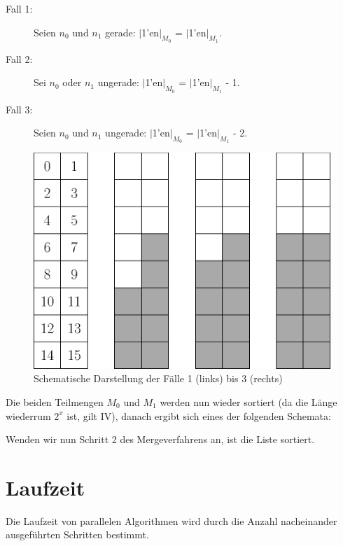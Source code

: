 \documentclass[11pt,ngerman]{article}
\begin{document}
\begin{description}
\begin{description}
\item[Fall 1:] Seien $n_0$ und $n_1$ gerade: $|$1'en$|_{M_0}$ = $|$1'en$|_{M_1}$.
\item[Fall 2:] Sei $n_0$ oder $n_1$ ungerade: $|$1'en$|_{M_0}$ = $|$1'en$|_{M_1}$ - 1.
\item[Fall 3:] Seien $n_0$ und $n_1$ ungerade: $|$1'en$|_{M_0}$ = $|$1'en$|_{M_1}$ - 2.
\end{description}
\begin{figure}
\begin{center}
\includegraphics[scale=0.4]{korrektheitOEM.eps}
\caption{Schematische Darstellung der Fälle 1 (links) bis 3 (rechts)}
\end{center}
\end{figure}
Die beiden Teilmengen $M_0$ und $M_1$ werden nun wieder sortiert (da die Länge wiederrum $2^x$ ist, gilt IV), danach ergibt sich eines der folgenden Schemata:
\end{description}
Wenden wir nun Schritt 2 des Mergeverfahrens an, ist die Liste sortiert.
\section{Laufzeit}
Die Laufzeit von parallelen Algorithmen wird durch die Anzahl nacheinander ausgeführten Schritten bestimmt.
\end{document}
